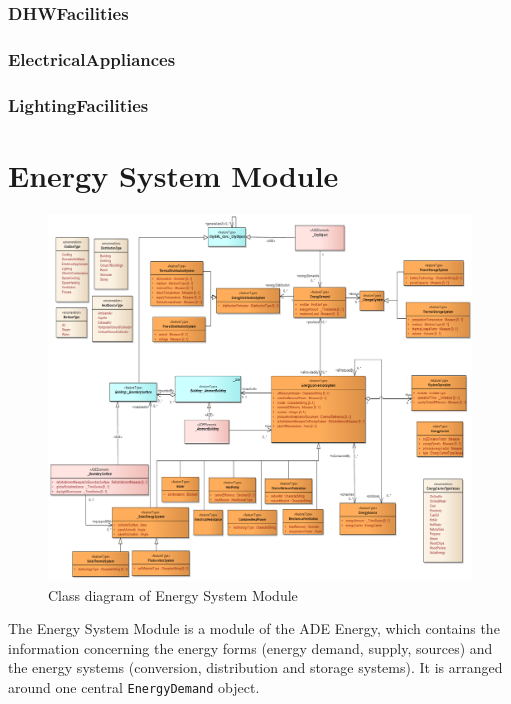 \documentclass[a4paper,12pt]{article}
\let\stdsection\section%
\renewcommand\section{\newpage\stdsection}
\begin{document}
\subsubsection{DHWFacilities}\label{dhwfacilities}

\subsubsection{ElectricalAppliances}\label{electricalappliances}

\subsubsection{LightingFacilities}\label{lightingfacilities}

\section{Energy System Module}\label{energy-system-module}

\begin{figure}[htbp]
\centering
\includegraphics{fig/class_EnergySystem.png}
\caption{Class diagram of Energy System Module}
\end{figure}

The Energy System Module is a module of the ADE Energy, which contains
the information concerning the energy forms (energy demand, supply,
sources) and the energy systems (conversion, distribution and storage
systems). It is arranged around one central \texttt{EnergyDemand}
object.
\end{document}
